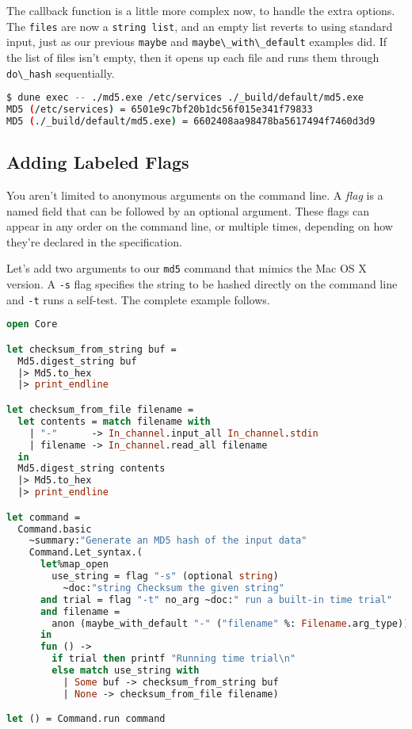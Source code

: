 The callback function is a little more complex now, to handle the extra
options. The \passthrough{\lstinline!files!} are now a
\passthrough{\lstinline!string list!}, and an empty list reverts to
using standard input, just as our previous
\passthrough{\lstinline!maybe!} and
\passthrough{\lstinline!maybe\_with\_default!} examples did. If the list
of files isn't empty, then it opens up each file and runs them through
\passthrough{\lstinline!do\_hash!} sequentially.

\begin{lstlisting}[language=bash]
$ dune exec -- ./md5.exe /etc/services ./_build/default/md5.exe
MD5 (/etc/services) = 6501e9c7bf20b1dc56f015e341f79833
MD5 (./_build/default/md5.exe) = 6602408aa98478ba5617494f7460d3d9
\end{lstlisting}

\hypertarget{adding-labeled-flags}{%
\subsection{Adding Labeled Flags}\label{adding-labeled-flags}}

You aren't limited to anonymous arguments on the command line. A
\emph{flag} is a named field that can be followed by an optional
argument. These flags can appear in any order on the command line, or
multiple times, depending on how they're declared in the specification.

Let's add two arguments to our \passthrough{\lstinline!md5!} command
that mimics the Mac OS X version. A \passthrough{\lstinline!-s!} flag
specifies the string to be hashed directly on the command line and
\passthrough{\lstinline!-t!} runs a self-test. The complete example
follows.

\begin{lstlisting}[language=Caml]
open Core

let checksum_from_string buf =
  Md5.digest_string buf
  |> Md5.to_hex
  |> print_endline

let checksum_from_file filename =
  let contents = match filename with
    | "-"      -> In_channel.input_all In_channel.stdin
    | filename -> In_channel.read_all filename
  in
  Md5.digest_string contents
  |> Md5.to_hex
  |> print_endline

let command =
  Command.basic
    ~summary:"Generate an MD5 hash of the input data"
    Command.Let_syntax.(
      let%map_open
        use_string = flag "-s" (optional string)
          ~doc:"string Checksum the given string"
      and trial = flag "-t" no_arg ~doc:" run a built-in time trial"
      and filename =
        anon (maybe_with_default "-" ("filename" %: Filename.arg_type))
      in
      fun () ->
        if trial then printf "Running time trial\n"
        else match use_string with
          | Some buf -> checksum_from_string buf
          | None -> checksum_from_file filename)

let () = Command.run command
\end{lstlisting}

